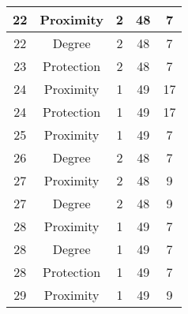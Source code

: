 \documentclass[results.tex]{subfiles}
\begin{document}
\begin{center}
\begin{tabular}{| c || c | c | c | c |}
            \hline
            22                      & Proximity                    & 2                      & 48                      & 7                    \\
            \hline
            22                      & Degree                       & 2                      & 48                      & 7                    \\
            \hline
            23                      & Protection                   & 2                      & 48                      & 7                    \\
            \hline
            24                      & Proximity                    & 1                      & 49                      & 17                   \\
            \hline
            24                      & Protection                   & 1                      & 49                      & 17                   \\
            \hline
            25                      & Proximity                    & 1                      & 49                      & 7                    \\
            \hline
            26                      & Degree                       & 2                      & 48                      & 7                    \\
            \hline
            27                      & Proximity                    & 2                      & 48                      & 9                    \\
            \hline
            27                      & Degree                       & 2                      & 48                      & 9                    \\
            \hline
            28                      & Proximity                    & 1                      & 49                      & 7                    \\
            \hline
            28                      & Degree                       & 1                      & 49                      & 7                    \\
            \hline
            28                      & Protection                   & 1                      & 49                      & 7                    \\
            \hline
            29                      & Proximity                    & 1                      & 49                      & 9                    \\

\end{tabular}
\end{center}
\end{document}

